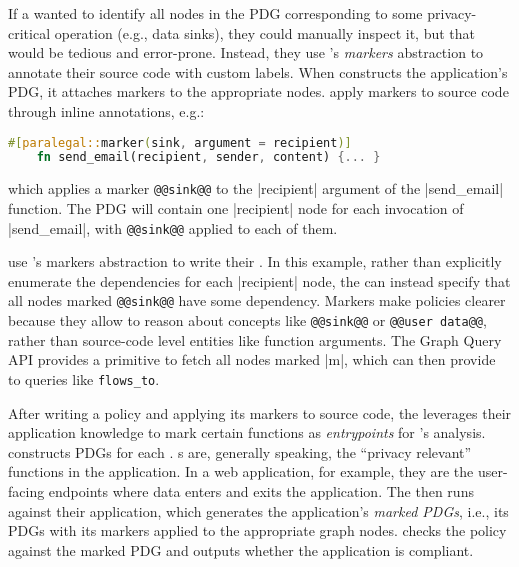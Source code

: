 If a \ce{} wanted to identify all nodes in the PDG corresponding to some privacy-critical operation
(e.g., data sinks), they could manually inspect it, but that would be tedious and error-prone.
%
Instead, they use \sys's \emph{markers} abstraction to annotate their source code with custom labels.
%
When \sys{} constructs the application's PDG, it attaches markers to the appropriate nodes.
%
\Devs{} apply markers to source code through inline annotations, e.g.:
\begin{lstlisting}[language=Rust]
    #[paralegal::marker(sink, argument = recipient)]
    fn send_email(recipient, sender, content) {... }
\end{lstlisting}
which applies a marker \lstinline[language=CNL]|@@sink@@| to the |recipient| argument of the |send_email| function.
%
The PDG will contain one |recipient| node for each invocation of |send_email|, with \lstinline[language=CNL]|@@sink@@| applied to each of them.

\Writers{} use \sys{}'s markers abstraction to write their \policies{}.
%
In this example, rather than explicitly enumerate the dependencies for each |recipient| node,
the \writer{} can instead specify that all nodes marked \lstinline[language=CNL]|@@sink@@| have some dependency.
%
Markers make policies clearer because they allow \writers{} to reason about concepts like 
\lstinline[language=CNL]|@@sink@@| or \lstinline[language=CNL]|@@user data@@|,
rather than source-code level entities like function arguments.
%
The \sys{} Graph Query API provides a primitive to fetch all nodes marked |m|, 
which \devs{} can then provide to queries like \lstinline[language=Rust]|flows_to|.

After writing a policy and applying its markers to source code,
the \dev{} leverages their application knowledge to mark certain functions 
as \emph{entrypoints} for \sys{}'s analysis.
%
\sys{} constructs PDGs for each \controller{}.
%
\Controller{}s are, generally speaking, the ``privacy relevant'' functions in the application.
%
In a web application, for example, they are the user-facing endpoints where data enters and exits the application.
%
The \dev{} then runs \sys{} against their application, which generates the application's \emph{marked PDGs},
i.e., its PDGs with its markers applied to the appropriate graph nodes.
%
\sys{} checks the policy against the marked PDG and outputs whether the application is compliant.
